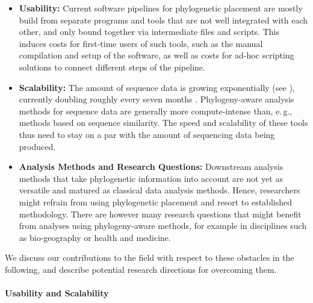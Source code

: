 \begin{itemize}
    \item \textbf{Usability:}
          Current software pipelines for phylogenetic placement are mostly build from separate programs and tools
          that are not well integrated with each other, and only bound together via intermediate files and scripts.
          This induces costs for first-time users of such tools, such as the manual compilation and setup of the software,
          as well as costs for ad-hoc scripting solutions to connect different steps of the pipeline.
    \item \textbf{Scalability:}
          The amount of sequence data is growing exponentially (see ),
          currently doubling roughly every seven months \cite{Stephens2015}.
          Phylogeny-aware analysis methods for sequence data are generally more compute-intense than, e.\,g.,
          methods based on sequence similarity.
          The speed and scalability of these tools thus
          need to stay on a par with the amount of sequencing data being produced.
    \item \textbf{Analysis Methods and Research Questions:}
          Downstream analysis methods that take phylogenetic information into account
          are not yet as versatile and matured as classical data analysis methods.
          Hence, researchers might refrain from using phylogenetic placement and resort to established methodology.
          There are however many research questions that might benefit from analyses using phylogeny-aware methods,
          for example in disciplines such as bio-geography or health and medicine.
\end{itemize}

We discuss our contributions to the field with respect to these obstacles in the following,
and describe potential research directions for overcoming them.

\paragraph{Usability and Scalability}
\label{ch:ConclusionOutlook:par:UsabilityScalability}

